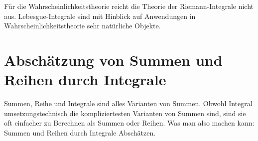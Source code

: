 \begin{bem}
	Für die Wahrscheinlichkeitstheorie reicht die Theorie der Riemann-Integrale nicht aus. Lebesgue-Integrale sind mit Hinblick auf Anwendungen in Wahrscheinlichkeitstheorie sehr natürliche Objekte. 
\end{bem} 

\section{Abschätzung von Summen und Reihen durch Integrale}

\begin{bem}
	Summen, Reihe und Integrale sind alles Varianten von Summen. Obwohl Integral umsetzungstechnisch die kompliziertesten Varianten von Summen sind, sind sie oft einfacher zu Berechnen als Summen oder Reihen. Was man also machen kann: Summen und Reihen durch Integrale Abschätzen. 
\end{bem} 

